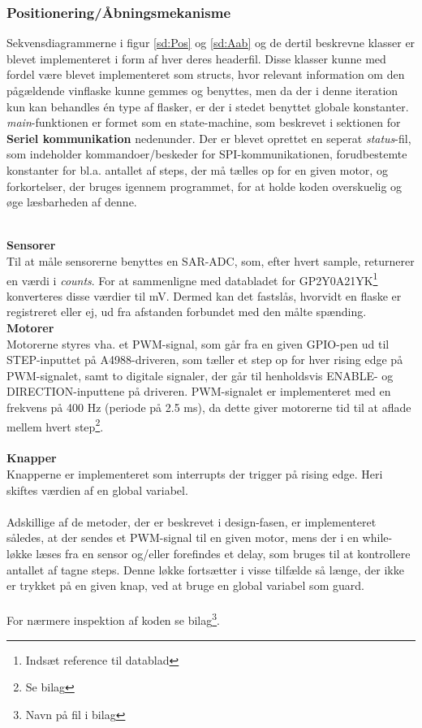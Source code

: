 \subsubsection{Positionering/Åbningsmekanisme}
Sekvensdiagrammerne i figur \ref{sd:Pos} og \ref{sd:Aab} og de dertil beskrevne klasser er blevet implementeret i form af hver deres headerfil. Disse klasser kunne med fordel være blevet implementeret som structs, hvor relevant information om den pågældende vinflaske kunne gemmes og benyttes, men da der i denne iteration kun kan behandles én type af flasker, er der i stedet benyttet globale konstanter. \textit{main}-funktionen er formet som en state-machine, som beskrevet i sektionen for \textbf{Seriel kommunikation} nedenunder. Der er blevet oprettet en seperat \textit{status}-fil, som indeholder kommandoer/beskeder for SPI-kommunikationen, forudbestemte konstanter for bl.a. antallet af steps, der må tælles op for en given motor, og forkortelser, der bruges igennem programmet, for at holde koden overskuelig og øge læsbarheden af denne.

\\
\textbf{Sensorer} \\
Til at måle sensorerne benyttes en SAR-ADC, som, efter hvert sample, returnerer en værdi i \textit{counts}. For at sammenligne med databladet for GP2Y0A21YK\footnote{Indsæt reference til datablad} konverteres disse værdier til mV. Dermed kan det fastslås, hvorvidt en flaske er registreret eller ej, ud fra afstanden forbundet med den målte spænding.
\\
\textbf{Motorer} \\
Motorerne styres vha. et PWM-signal, som går fra en given GPIO-pen ud til STEP-inputtet på A4988-driveren, som tæller et step op for hver rising edge på PWM-signalet, samt to digitale signaler, der går til henholdsvis ENABLE- og DIRECTION-inputtene på driveren. PWM-signalet er implementeret med en frekvens på 400 Hz (periode på 2.5 ms), da dette giver motorerne tid til at aflade mellem hvert step\footnote{Se bilag}. \\
\\
\textbf{Knapper} \\
Knapperne er implementeret som interrupts der trigger på rising edge. Heri skiftes værdien af en global variabel. \\
\\
Adskillige af de metoder, der er beskrevet i design-fasen, er implementeret således, at der sendes et PWM-signal til en given motor, mens der i en while-løkke læses fra en sensor og/eller forefindes et delay, som bruges til at kontrollere antallet af tagne steps. Denne løkke fortsætter i visse tilfælde så længe, der ikke er trykket på en given knap, ved at bruge en global variabel som guard.
\\
\\
For nærmere inspektion af koden se bilag\footnote{Navn på fil i bilag}.